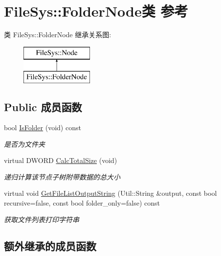 \hypertarget{class_file_sys_1_1_folder_node}{\section{File\-Sys\-:\-:Folder\-Node类 参考}
\label{class_file_sys_1_1_folder_node}
}
类 File\-Sys\-:\-:Folder\-Node 继承关系图\-:\begin{figure}[H]
\begin{center}
\leavevmode
\includegraphics[height=2.000000cm]{class_file_sys_1_1_folder_node}
\end{center}
\end{figure}
\subsection*{Public 成员函数}
\begin{DoxyCompactItemize}
\item 
bool \hyperlink{class_file_sys_1_1_folder_node_a050961bdc9d98b7645bc518e215dd929}{Is\-Folder} (void) const 
\begin{DoxyCompactList}\small\item\em 是否为文件夹 \end{DoxyCompactList}\item 
virtual D\-W\-O\-R\-D \hyperlink{class_file_sys_1_1_folder_node_a6110e52309d675646c67b37e60b37ee5}{Calc\-Total\-Size} (void)
\begin{DoxyCompactList}\small\item\em 递归计算该节点子树附带数据的总大小 \end{DoxyCompactList}\item 
virtual void \hyperlink{class_file_sys_1_1_folder_node_a49bedb5a2504bdc13a86bcd38aa31ef6}{Get\-File\-List\-Output\-String} (Util\-::\-String \&output, const bool recursive=false, const bool folder\-\_\-only=false) const 
\begin{DoxyCompactList}\small\item\em 获取文件列表打印字符串 \end{DoxyCompactList}\end{DoxyCompactItemize}
\subsection*{额外继承的成员函数}


